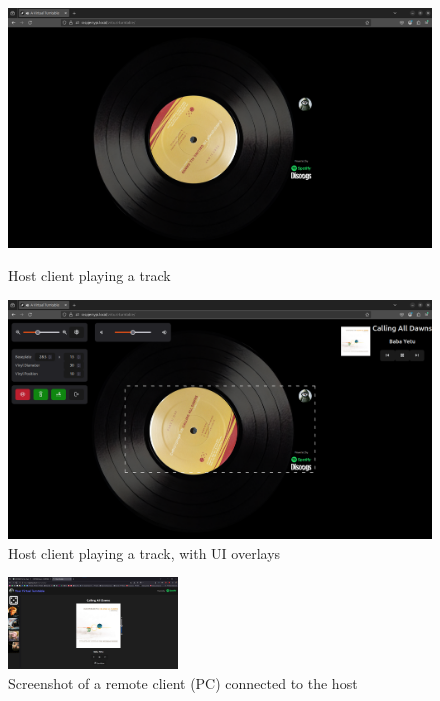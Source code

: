             \begin{figure}[h]
                \centering
                \begin{minipage}[b]{0.45\textwidth}
                    \centering
                    \includegraphics[width=\textwidth]{images/screenshots/HOST_Quiet.png}
                    \caption{Host client playing a track}
                    \label{fig:hostQuiet}
                \end{minipage}
                \hfill
                \begin{minipage}[b]{0.45\textwidth}
                    \centering
                    \includegraphics[width=\textwidth]{images/screenshots/HOST_GUI.png}
                    \caption{Host client playing a track, with UI overlays}
                    \label{fig:hostGui}
                \end{minipage}
            \end{figure}
            
            \begin{figure}[h]
                \centering
                \includegraphics[width=0.4\textwidth]{images/screenshots/LAPTOP.png}
                \caption{Screenshot of a remote client (PC) connected to the host}
                \label{fig:laptop}
            \end{figure}
            
